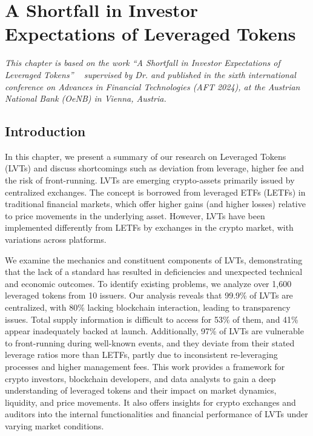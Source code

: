
\chapter{A Shortfall in Investor Expectations of Leveraged Tokens}\label{ch:shortfall}

\textit{This chapter is based on the work ``A Shortfall in Investor Expectations of Leveraged Tokens'' ~\cite{shortfall} supervised by Dr. \supv and published in the sixth international conference on Advances in Financial Technologies (AFT 2024), at the Austrian National Bank (OeNB) in Vienna, Austria.}

\section{Introduction}
In this chapter, we present a summary of our research on Leveraged Tokens (LVTs) and discuss shortcomings such as deviation from leverage, higher fee and the risk of front-running. LVTs are emerging crypto-assets primarily issued by centralized exchanges. The concept is borrowed from leveraged ETFs (LETFs) in traditional financial markets, which offer higher gains (and higher losses) relative to price movements in the underlying asset. However, LVTs have been implemented differently from LETFs by exchanges in the crypto market, with variations across platforms.

We examine the mechanics and constituent components of LVTs, demonstrating that the lack of a standard has resulted in deficiencies and unexpected technical and economic outcomes. To identify existing problems, we analyze over 1,600 leveraged tokens from 10 issuers. Our analysis reveals that 99.9\% of LVTs are centralized, with 80\% lacking blockchain interaction, leading to transparency issues. Total supply information is difficult to access for 53\% of them, and 41\% appear inadequately backed at launch. Additionally, 97\% of LVTs are vulnerable to front-running during well-known events, and they deviate from their stated leverage ratios more than LETFs, partly due to inconsistent re-leveraging processes and higher management fees. This work provides a framework for crypto investors, blockchain developers, and data analysts to gain a deep understanding of leveraged tokens and their impact on market dynamics, liquidity, and price movements. It also offers insights for crypto exchanges and auditors into the internal functionalities and financial performance of LVTs under varying market conditions.


